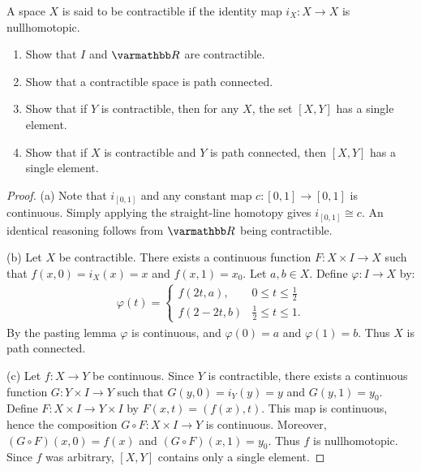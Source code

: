 \documentclass[10pt,oneside,openany]{memoir}
\begin{document}
\begin{exercise}[manual-num={3}]
A space $X$ is said to be contractible if the identity map $i_X:X \rightarrow X$ is nullhomotopic.
\begin{enumerate}[label = (\alph*),itemsep=1pt,topsep=3pt]
    \item Show that $I$ and $\bfR$ are contractible.
    \item Show that a contractible space is path connected.
    \item Show that if $Y$ is contractible, then for any $X$, the set $[X,Y]$ has a single element.
    \item Show that if $X$ is contractible and $Y$ is path connected, then $[X,Y]$ has a single element.
\end{enumerate}
\end{exercise}
    \begin{proof}
        (a) Note that $i_{[0,1]}$ and any constant map $c:[0,1] \rightarrow [0,1]$ is continuous. Simply applying the straight-line homotopy gives $i_{[0,1]} \cong c$. An identical reasoning follows from $\bfR$ being contractible.

        (b) Let $X$ be contractible. There exists a continuous function $F:X \times I \rightarrow X$ such that $f(x,0) = i_X(x) = x$ and $f(x,1) = x_0$. Let $a,b \in X$. Define $\varphi:I \rightarrow X$ by:
            \begin{equation*}
            \begin{split}
                \varphi(t)=\begin{cases}
                f(2t,a), & 0 \leq t \leq \frac{1}{2} \\
                f(2-2t,b) & \frac{1}{2} \leq t \leq 1.
                \end{cases}
            \end{split}
            \end{equation*}
        By the pasting lemma $\varphi$ is continuous, and $\varphi(0) = a$ and $\varphi(1) = b$. Thus $X$ is path connected.

        (c) Let $f:X \rightarrow Y$ be continuous. Since $Y$ is contractible, there exists a continuous function $G:Y \times I \rightarrow Y$ such that $G(y,0) = i_Y(y) = y$ and $G(y,1) = y_0$. Define $F:X \times I \rightarrow Y \times I$ by $F(x,t) = (f(x),t)$. This map is continuous, hence the composition $G \circ F :X \times I \rightarrow Y$ is continuous. Moreover, $(G\circ F)(x,0) = f(x)$ and $(G\circ F)(x,1) = y_0$. Thus $f$ is nullhomotopic. Since $f$ was arbitrary, $[X,Y]$ contains only a single element.


\end{proof}
\end{document}
